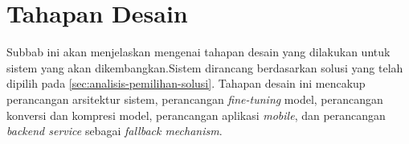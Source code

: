 \section{Tahapan Desain}
\label{sec:tahapan-desain}
Subbab ini akan menjelaskan mengenai tahapan desain yang dilakukan untuk sistem yang akan dikembangkan.Sistem dirancang berdasarkan solusi yang telah dipilih pada \autoref{sec:analisis-pemilihan-solusi}. Tahapan desain ini mencakup perancangan arsitektur sistem, perancangan \emph{fine-tuning} model, perancangan konversi dan kompresi model, perancangan aplikasi \emph{mobile}, dan perancangan \emph{backend service} sebagai \emph{fallback mechanism}.









   